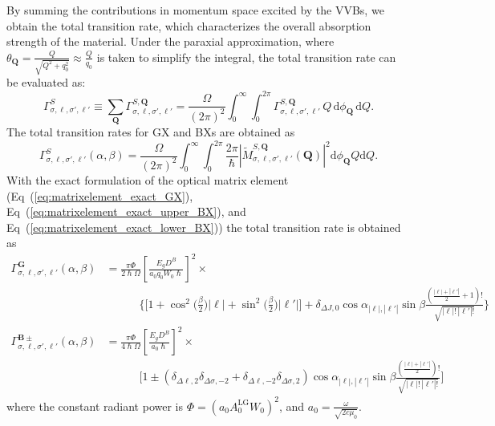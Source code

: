 By summing the contributions in momentum space excited by the VVBs, we obtain the total transition rate, which characterizes the overall absorption strength of the material. Under the paraxial approximation, where $\theta_{\boldsymbol{Q}} = \frac{Q}{\sqrt{Q^2+q_0^2}} \approx \frac{Q}{q_0}$ is taken to simplify the integral, the total transition rate can be evaluated as:
\[
\Gamma^{S}_{\sigma, \ell, \sigma', \ell'} 
\equiv 
\sum_{\boldsymbol{Q}} 
\Gamma^{S, \boldsymbol{Q}}_{\sigma, \ell, \sigma', \ell'} 
=
\frac{\Omega}{(2\pi)^2} 
\int_0^\infty \int_0^{2\pi} 
\Gamma^{S, \boldsymbol{Q}}_{\sigma, \ell, \sigma', \ell'} 
\, Q \, \mathrm{d}\phi_{\boldsymbol{Q}} \, \mathrm{d}Q.
\]
The total transition rates for GX and BXs are obtained as
\begin{equation}
\Gamma_{\sigma,\ell,\sigma',\ell'}^S(\alpha, \beta) 
= \frac{\Omega}{(2\pi)^2} \int_0^\infty \int_0^{2\pi} \frac{2\pi}{\hslash} \left| \widetilde{M}_{\sigma,\ell,\sigma',\ell'}^{S,\boldsymbol{Q}}(\boldsymbol{Q}) \right|^2 \mathrm{d}\phi_{\boldsymbol{Q}} Q \mathrm{d}Q.
\end{equation}
\noindent
With the exact formulation of the optical matrix element (Eq~(\ref{eq:matrixelement_exact_GX}), Eq~(\ref{eq:matrixelement_exact_upper_BX}), and Eq~(\ref{eq:matrixelement_exact_lower_BX})) the total transition rate is obtained as
\begin{align}
\Gamma_{\sigma,\ell,\sigma',\ell'}^{\boldsymbol{G}}(\alpha, \beta) 
&= \frac{\pi \Phi}{2\hslash \Omega} \left[ \frac{E_g D^B}{a_0 q_0 W_0 \hslash} \right]^2 \times \nonumber \\
&\quad\quad\quad \Big\{ \Big[ 1 + \cos^2\big(\tfrac{\beta}{2}\big) |\ell| + \sin^2\big(\tfrac{\beta}{2}\big) |\ell'| \Big] + \delta_{\Delta J, 0} \cos\alpha_{|\ell|,|\ell'|} \sin\beta \frac{(\tfrac{|\ell|+|\ell'|}{2} + 1)!}{\sqrt{|\ell|! \, |\ell'|!}} \Big\} 
\label{eq:gamma_G} \\[8pt]
\Gamma_{\sigma,\ell,\sigma',\ell'}^{\boldsymbol{B}\pm}(\alpha, \beta) 
&= \frac{\pi \Phi}{4\hslash \Omega} \left[ \frac{E_g D^B}{a_0 \hslash} \right]^2 \times \nonumber \\
&\quad\quad\quad \Big[ 1 \pm (\delta_{\Delta\ell, 2} \delta_{\Delta\sigma, -2} + \delta_{\Delta\ell, -2} \delta_{\Delta\sigma, 2}) \cos\alpha_{|\ell|,|\ell'|} \sin\beta \frac{(\tfrac{|\ell|+|\ell'|}{2})!}{\sqrt{|\ell|! \, |\ell'|!}} \Big]
\label{eq:gamma_B_pm}
\end{align}
where the constant radiant power is $\Phi = (a_0 A_0^{\mathrm{LG}} W_0)^2$, and $a_0 = \frac{\omega}{\sqrt{2c\mu_0}}$. 

